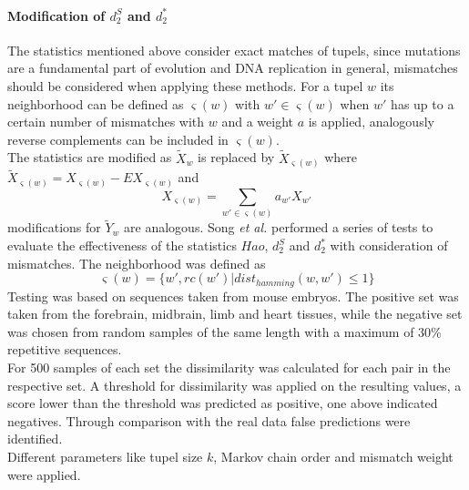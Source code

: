 \documentclass[twocolumn]{bmcart}%
\begin{document}
\paragraph*{Modification of $d_2^S$ and $d_2^*$}
The statistics mentioned above consider exact matches of tupels, since mutations are a fundamental part of evolution and DNA replication in general, mismatches should be considered when applying these methods. For a tupel $w$ its neighborhood can be defined as $\varsigma(w)$ with $w' \in \varsigma(w)$ when $w'$ has up to a certain number of mismatches with $w$ and a weight $a$ is applied, analogously reverse complements can be included in $\varsigma(w)$.\\
The statistics are modified as $\widetilde{X}_w$ is replaced by $\widetilde{X}_{\varsigma(w)}$ where $\widetilde{X}_{\varsigma(w)}=X_{\varsigma(w)}-EX_{\varsigma(w)}$ and 
$$X_{\varsigma(w)}=\sum_{w'\in\varsigma(w)}a_{w'}X_{w'}$$ 
modifications for $\widetilde{Y}_w$ are analogous.
Song \textit{et al.} performed a series of tests to evaluate the effectiveness of the statistics $Hao$, $d_2^S$ and $d_2^*$ with consideration of mismatches. The neighborhood was defined as $$\varsigma(w)=\{w',rc(w')|dist_{hamming}(w,w')\leq 1\}$$
Testing was based on sequences taken from mouse embryos. The positive set was taken from the forebrain, midbrain, limb and heart tissues, while the negative set was chosen from random samples of the same length with a maximum of 30\% repetitive sequences\cite{doi:10.1093/bib/bbt067}.\\
For 500 samples of each set the dissimilarity was calculated for each pair in the respective set. A threshold for dissimilarity was applied on the resulting values, a score lower than the threshold was predicted as positive, one above indicated negatives. Through comparison with the real data false predictions were identified.\\
Different parameters like tupel size $k$, Markov chain order and mismatch weight were applied.
\end{document}

